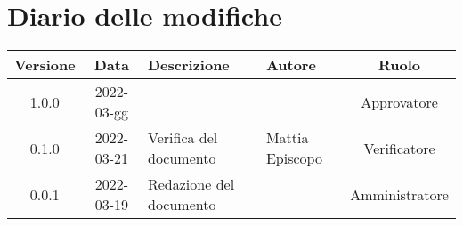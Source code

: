 \section*{Diario delle modifiche}
	\begin{center}
	\renewcommand{\arraystretch}{1.8} %
	\begin{tabular}{ |c|c|m{12em}|m{7em}|c| }
		\hline
		\textbf{Versione} & \textbf{Data} & \textbf{Descrizione} &  \textbf{Autore} &  \textbf{Ruolo} \\
		\hline
		1.0.0 & 2022-03-gg & & & Approvatore\\
		\hline
		0.1.0 & 2022-03-21 & Verifica del documento & Mattia \newline Episcopo & Verificatore\\
		\hline
		0.0.1 & 2022-03-19 & Redazione del documento & \docRedattori & Amministratore\\
		\hline
	\end{tabular}
	\end{center}
	\newpage